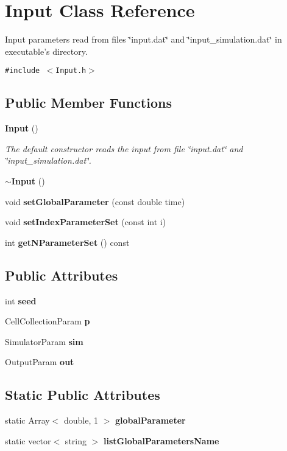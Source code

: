 \section{Input Class Reference}
\label{classInput}
Input parameters read from files \char`\"{}input.dat\char`\"{} and \char`\"{}input\_\-simulation.dat\char`\"{} in executable's directory.  


{\tt \#include $<$Input.h$>$}

\subsection*{Public Member Functions}
\begin{CompactItemize}
\item 
{\bf Input} ()
\begin{CompactList}\small\item\em The default constructor reads the input from file \char`\"{}input.dat\char`\"{} and \char`\"{}input\_\-simulation.dat\char`\"{}. \item\end{CompactList}\item 
{\bf $\sim$Input} ()
\item 
void {\bf setGlobalParameter} (const double time)
\item 
void {\bf setIndexParameterSet} (const int i)
\item 
int {\bf getNParameterSet} () const 
\end{CompactItemize}
\subsection*{Public Attributes}
\begin{CompactItemize}
\item 
int {\bf seed}
\item 
CellCollectionParam {\bf p}
\item 
SimulatorParam {\bf sim}
\item 
OutputParam {\bf out}
\end{CompactItemize}
\subsection*{Static Public Attributes}
\begin{CompactItemize}
\item 
static Array$<$ double, 1 $>$ {\bf globalParameter}
\item 
static vector$<$ string $>$ {\bf listGlobalParametersName}
\end{CompactItemize}
